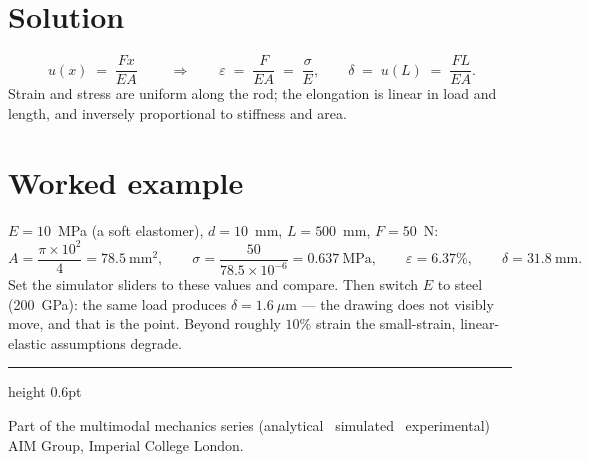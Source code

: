 \documentclass[10pt,a4paper]{article}
\begin{document}
\section*{Solution}
\begin{equation}
\boxed{\; u(x) \;=\; \frac{F x}{E A} \;}
\qquad\Rightarrow\qquad
\varepsilon \;=\; \frac{F}{EA} \;=\; \frac{\sigma}{E},
\qquad
\delta \;=\; u(L) \;=\; \frac{F L}{E A}.
\end{equation}
Strain and stress are uniform along the rod; the elongation is linear in load and
length, and inversely proportional to stiffness and area.

\section*{Worked example}
$E = 10$~MPa (a soft elastomer), $d = 10$~mm, $L = 500$~mm, $F = 50$~N:
\begin{equation}
A = \frac{\pi \times 10^2}{4} = 78.5~\text{mm}^2, \qquad
\sigma = \frac{50}{78.5\times10^{-6}} = 0.637~\text{MPa}, \qquad
\varepsilon = 6.37\%, \qquad
\delta = 31.8~\text{mm}.
\end{equation}
Set the simulator sliders to these values and compare. Then switch $E$ to steel
(200~GPa): the same load produces $\delta = 1.6~\mu$m --- the drawing does not
visibly move, and that is the point. Beyond roughly $10\%$ strain the
small-strain, linear-elastic assumptions degrade.

\vfill
{\color{celline}\hrule height 0.6pt}
\smallskip
{\footnotesize\textcolor{celdark}{Part of the multimodal mechanics series
(analytical \textperiodcentered\ simulated \textperiodcentered\ experimental)
\,\textperiodcentered\, AIM Group, Imperial College London.}}
\end{document}
